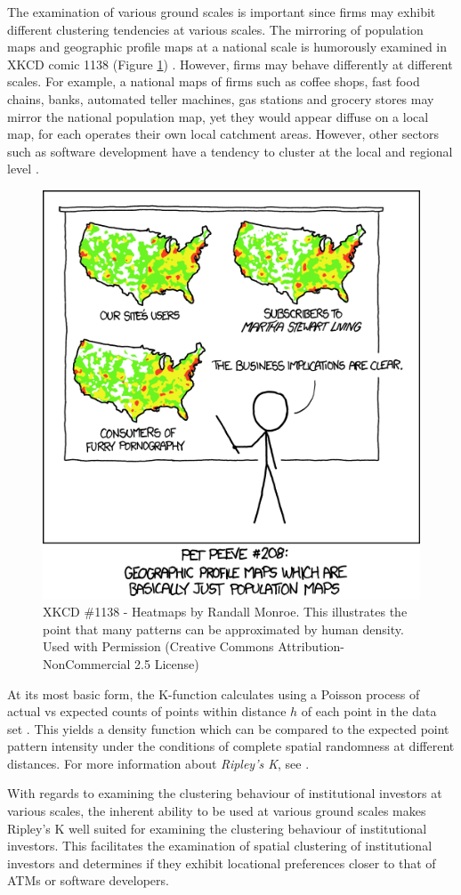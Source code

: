The examination of various ground scales is important since firms may exhibit different clustering tendencies at various scales.  The mirroring of population maps and geographic profile maps at a national scale is humorously examined in XKCD comic 1138 (Figure \ref{fig:heatmapxkcd}) \citep{XKCD1138}.  However, firms may behave differently at different scales.  For example, a national maps of firms such as coffee shops, fast food chains, banks, automated teller machines, gas stations and grocery stores may mirror the national population map, yet they would appear diffuse on a local map, for each operates their own local catchment areas.  However, other sectors such as software development have a tendency to cluster at the local and regional level \citep{Meyer2006}.  

\begin{figure}
	\centering
	\includegraphics[width=0.5\linewidth]{Figures/ChapterIII/heatmap_XKCD}
	\caption[XKCD 1138 - Heatmaps]{XKCD \#1138 - Heatmaps by Randall Monroe. This illustrates the point that many patterns can be approximated by human density. Used with Permission (Creative Commons Attribution-NonCommercial 2.5 License)}
	\label{fig:heatmapxkcd}
\end{figure}

At its most basic form, the K-function calculates using a Poisson process of actual vs expected counts of points within distance $h$ of each point in the data set \citep{dixon2014r}.  This yields a density function which can be compared to the expected point pattern intensity under the conditions of complete spatial randomness at different distances.  For more information about\textit{ Ripley's K}, see \cite{ripley1976second,fischer2009handbook,spatstatBook}.

With regards to examining the clustering behaviour of institutional investors at various scales, the inherent ability to be used at various ground scales makes Ripley's K well suited for examining the clustering behaviour of institutional investors.  This facilitates the examination  of spatial clustering of institutional investors  and determines if they exhibit locational preferences closer to that of ATMs or software developers. 

